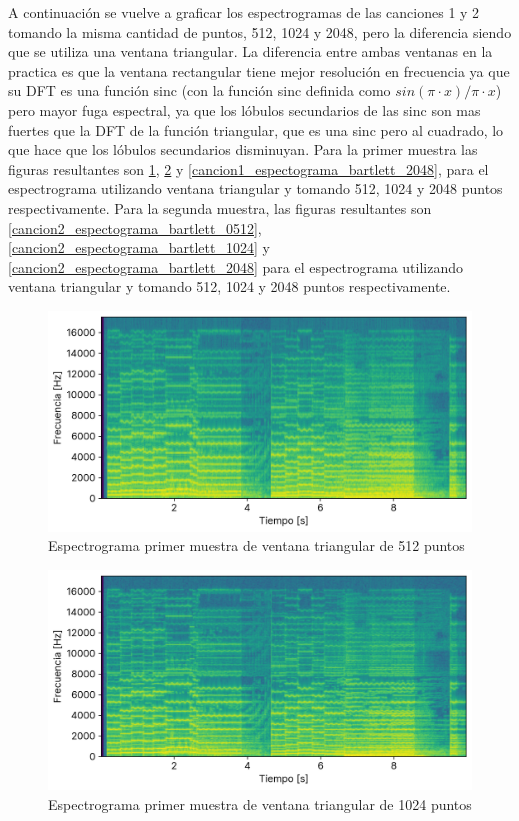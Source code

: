 \documentclass[12pt]{article}
\begin{document}
A continuación se vuelve a graficar los espectrogramas de las canciones 1 y 2 tomando la misma cantidad de puntos, 512, 1024 y 2048, pero la diferencia siendo que se utiliza una ventana triangular. La diferencia entre ambas ventanas en la practica es que la ventana rectangular tiene mejor resolución en frecuencia ya que su DFT es una función sinc (con la función sinc definida como $sin(\pi\cdot x)/\pi\cdot x$) pero mayor fuga espectral, ya que los lóbulos secundarios de las sinc son mas fuertes que la DFT de la función triangular, que es una sinc pero al cuadrado, lo que hace que los lóbulos secundarios disminuyan. Para la primer muestra las figuras resultantes son \ref{cancion1_espectograma_bartlett_0512}, \ref{cancion1_espectograma_bartlett_1024} y \ref{cancion1_espectograma_bartlett_2048}, para el espectrograma utilizando ventana triangular y tomando 512, 1024 y 2048 puntos respectivamente. Para la segunda muestra, las figuras resultantes son \ref{cancion2_espectograma_bartlett_0512}, \ref{cancion2_espectograma_bartlett_1024} y \ref{cancion2_espectograma_bartlett_2048} para el espectrograma utilizando ventana triangular y tomando 512, 1024 y 2048 puntos respectivamente.

\begin{figure}[H]
\centering
\includegraphics{plot/cancion1_espectograma_bartlett_0512.png}
\caption{Espectrograma primer muestra de ventana triangular de 512 puntos}
\label{cancion1_espectograma_bartlett_0512}
\end{figure}

\begin{figure}[H]
\centering
\includegraphics{plot/cancion1_espectograma_bartlett_1024.png}
\caption{Espectrograma primer muestra de ventana triangular de 1024 puntos}
\label{cancion1_espectograma_bartlett_1024}
\end{figure}
\end{document}
